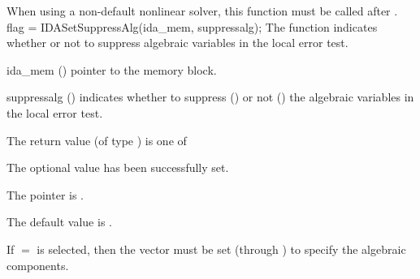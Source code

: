 {{  When using a non-default nonlinear solver, this function must be called after
  .
}
{
flag = IDASetSuppressAlg(ida\_mem, suppressalg);
}
{
  The function  indicates whether or not to
  suppress algebraic variables in the local error test.
}
{
  \begin{args}[suppressalg]
  \item[ida\_mem] ()
    pointer to the {\ida} memory block.
  \item[suppressalg] ()
    indicates whether to suppress () or not
    () the algebraic variables in the local error test.
  \end{args}
}
{
  The return value  (of type ) is one of
  \begin{args}
  \item[\Id{IDA\_SUCCESS}]
    The optional value has been successfully set.
  \item[\Id{IDA\_MEM\_NULL}]
    The  pointer is .
  \end{args}
}
{
  The default value is .

  If $=$ is selected, then the  vector
  must be set (through ) to specify the algebraic components.

}}
